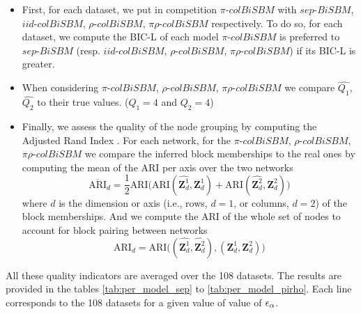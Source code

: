 \begin{itemize}
    \item First, for each dataset, we put in competition $\pi\text{-}colBiSBM$ with
    $sep\text{-}BiSBM$, $iid\text{-}colBiSBM$, $\rho\text{-}colBiSBM$,
    $\pi\rho\text{-}colBiSBM$
    respectively. To do so, for each dataset, we compute the
    BIC-L of each model $\pi\text{-}colBiSBM$ is preferred to $sep\text{-}BiSBM$
    (resp. $iid\text{-}colBiSBM$, $\rho\text{-}colBiSBM$,
    $\pi\rho\text{-}colBiSBM$) if
    its BIC-L is greater.
    \item When considering $\pi\text{-}colBiSBM$, $\rho\text{-}colBiSBM$,
    $\pi\rho\text{-}colBiSBM$ we compare $\widehat{Q_1}$, $\widehat{Q_2}$ to
    their true values. ($Q_1 = 4$ and $Q_2 = 4$)
    \item Finally, we assess the quality of the node grouping by computing the
    Adjusted Rand Index \parencite[][, ARI = 0 for a random grouping, ARI = 1 for a perfect recovery]{hubertComparingPartitions1985}. For each network, for the
    $\pi\text{-}colBiSBM$, $\rho\text{-}colBiSBM$,
    $\pi\rho\text{-}colBiSBM$ we compare the inferred block memberships to the
    real ones by computing the mean of the ARI per axis over the two networks
    \begin{equation*}
        \overline{\text{ARI}}_d = \frac{1}{2} \text{ARI}\big( \text{ARI}(\widehat{\bm{Z}^1_d},\bm{Z}^1_d) + \text{ARI}(\widehat{\bm{Z}^2_d},\bm{Z}^2_d) \big)
    \end{equation*}
    where $d$ is the dimension or axis (i.e., rows, $d=1$, or columns, $d=2$) of
    the block memberships.
    And we compute the ARI of the whole set of nodes to account for block
    pairing between networks
    \begin{equation*}
        \text{ARI}_d = \text{ARI}\big((\widehat{\bm{Z}^1_d},\widehat{\bm{Z}^2_d}),(\bm{Z}^1_d,\bm{Z}^2_d) \big)
    \end{equation*}
\end{itemize}

All these quality indicators are averaged over the 108 datasets. The
results are provided in the tables \ref{tab:per_model_sep} to
\ref{tab:per_model_pirho}. Each line corresponds to the 108 datasets for
a given value of value of \(\eps[\alpha]\).

